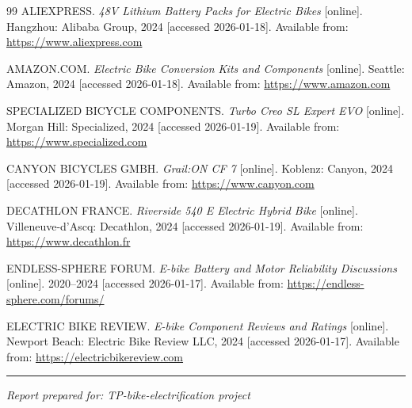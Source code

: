 \documentclass[12pt,a4paper]{article}
\begin{document}
\begin{thebibliography}{99}
ALIEXPRESS. \textit{48V Lithium Battery Packs for Electric Bikes} [online]. Hangzhou: Alibaba Group, 2024 [accessed 2026-01-18]. Available from: \url{https://www.aliexpress.com}

AMAZON.COM. \textit{Electric Bike Conversion Kits and Components} [online]. Seattle: Amazon, 2024 [accessed 2026-01-18]. Available from: \url{https://www.amazon.com}

SPECIALIZED BICYCLE COMPONENTS. \textit{Turbo Creo SL Expert EVO} [online]. Morgan Hill: Specialized, 2024 [accessed 2026-01-19]. Available from: \url{https://www.specialized.com}

CANYON BICYCLES GMBH. \textit{Grail:ON CF 7} [online]. Koblenz: Canyon, 2024 [accessed 2026-01-19]. Available from: \url{https://www.canyon.com}

DECATHLON FRANCE. \textit{Riverside 540 E Electric Hybrid Bike} [online]. Villeneuve-d'Ascq: Decathlon, 2024 [accessed 2026-01-19]. Available from: \url{https://www.decathlon.fr}

ENDLESS-SPHERE FORUM. \textit{E-bike Battery and Motor Reliability Discussions} [online]. 2020--2024 [accessed 2026-01-17]. Available from: \url{https://endless-sphere.com/forums/}

ELECTRIC BIKE REVIEW. \textit{E-bike Component Reviews and Ratings} [online]. Newport Beach: Electric Bike Review LLC, 2024 [accessed 2026-01-17]. Available from: \url{https://electricbikereview.com}

\end{thebibliography}

\vspace{1cm}
\noindent\rule{\textwidth}{0.4pt}

\noindent\textit{Report prepared for: TP-bike-electrification project}\\
\end{document}
